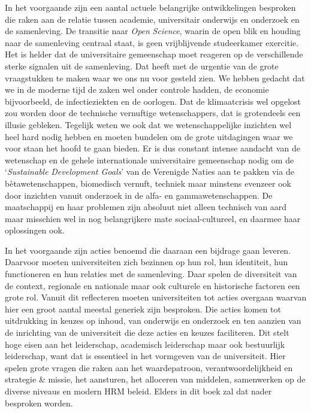 \documentclass[smallauthor, chapterhaspagenum, nochapterinheader, pagenuminheader,  bigchapnum,medium2, tocpages, garamond, titleinheader]{jote-book}
\begin{document}
	In het voorgaande zijn een aantal actuele belangrijke ontwikkelingen besproken die raken aan de relatie tussen academie, universitair onderwijs en onderzoek en de samenleving. De transitie naar \emph{Open }\emph{Science}, waarin de open blik en houding naar de samenleving centraal staat, is geen vrijblijvende studeerkamer exercitie. Het is helder dat de universitaire gemeenschap moet reageren op de verschillende sterke signalen uit de samenleving. Dat heeft met de urgentie van de grote vraagstukken te maken waar we ons nu voor gesteld zien. We hebben gedacht dat we in de moderne tijd de zaken wel onder controle hadden, de economie bijvoorbeeld, de infectieziekten en de oorlogen. Dat de klimaatcrisis wel opgelost zou worden door de technische vernuftige wetenschappers, dat is grotendeels een illusie gebleken. Tegelijk weten we ook dat we wetenschappelijke inzichten wel heel hard nodig hebben en moeten bundelen om de grote uitdagingen waar we voor staan het hoofd te gaan bieden. Er is dus constant intense aandacht van de wetenschap en de gehele internationale universitaire gemeenschap nodig om de ‘\emph{Sustainable}\emph{ Development Goals}' van de Verenigde Naties aan te pakken via de bètawetenschappen, biomedisch vernuft, techniek maar minstens evenzeer ook door inzichten vanuit onderzoek in de alfa- en gammawetenschappen. De maatschappij en haar problemen zijn absoluut niet alleen technisch van aard maar misschien wel in nog belangrijkere mate sociaal-cultureel, en daarmee haar oplossingen ook.



	In het voorgaande zijn acties benoemd die daaraan een bijdrage gaan leveren. Daarvoor moeten universiteiten zich bezinnen op hun rol, hun identiteit, hun functioneren en hun relaties met de samenleving. Daar spelen de diversiteit van de context, regionale en nationale maar ook culturele en historische factoren een grote rol. Vanuit dit reflecteren moeten universiteiten tot acties overgaan waarvan hier een groot aantal meestal generiek zijn besproken. Die acties komen tot uitdrukking in keuzes op inhoud, van onderwijs en onderzoek en ten aanzien van de inrichting van de universiteit die deze acties en keuzes faciliteren. Dit stelt hoge eisen aan het leiderschap, academisch leiderschap maar ook bestuurlijk leiderschap, want dat is essentieel in het vormgeven van de universiteit. Hier spelen grote vragen die raken aan het waardepatroon, verantwoordelijkheid en strategie \& missie, het aansturen, het alloceren van middelen, samenwerken op de diverse niveaus en modern HRM beleid. Elders in dit boek zal dat nader besproken worden.
\end{document}
